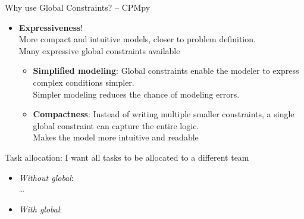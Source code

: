 \documentclass{cons-beamer}
\begin{document}
\begin{flashcardcpmpy}
\begin{frame}{Why use Global Constraints? -- CPMpy}
  \begin{itemize}
	\item[+] \textbf{Expressiveness}! \\
	More compact and intuitive models, closer to problem definition. \\ 
	Many expressive global constraints available \vfill 
	\begin{itemize}
		\item \textbf{Simplified modeling}: Global constraints enable the modeler to express complex conditions simpler. \\
		Simpler modeling reduces the chance of modeling errors.
		
		\item \textbf{Compactness}: Instead of writing multiple smaller constraints, a single global constraint can capture the entire logic. \\
		Makes the model more intuitive and readable
	\end{itemize}
  \end{itemize}
  \vfill

  \begin{example}
    Task allocation: I want all tasks to be allocated to a different team\\
    \begin{itemize}
      \item \textit{Without global}: \\  \dots \\
      \item \textit{With global}:  
    \end{itemize}
  \end{example}
\end{frame}
\end{flashcardcpmpy}
\end{document}
